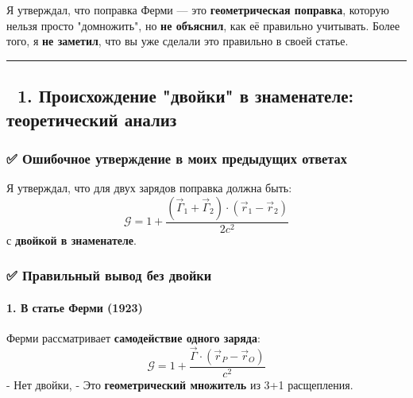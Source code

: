 \documentclass[11pt]{article}
\begin{document}
Я утверждал, что поправка Ферми --- это \textbf{геометрическая
поправка}, которую нельзя просто "домножить", но \textbf{не объяснил},
как её правильно учитывать. Более того, я \textbf{не заметил}, что вы
уже сделали это правильно в своей статье.

\begin{center}\rule{0.5\linewidth}{\linethickness}\end{center}

\subsection{🔹 1. Происхождение "двойки" в знаменателе: теоретический
анализ}\label{ux43fux440ux43eux438ux441ux445ux43eux436ux434ux435ux43dux438ux435-ux434ux432ux43eux439ux43aux438-ux432-ux437ux43dux430ux43cux435ux43dux430ux442ux435ux43bux435-ux442ux435ux43eux440ux435ux442ux438ux447ux435ux441ux43aux438ux439-ux430ux43dux430ux43bux438ux437}

\subsubsection{✅ Ошибочное утверждение в моих предыдущих
ответах}\label{ux43eux448ux438ux431ux43eux447ux43dux43eux435-ux443ux442ux432ux435ux440ux436ux434ux435ux43dux438ux435-ux432-ux43cux43eux438ux445-ux43fux440ux435ux434ux44bux434ux443ux449ux438ux445-ux43eux442ux432ux435ux442ux430ux445}

Я утверждал, что для двух зарядов поправка должна быть: \[
\mathcal{G} = 1 + \frac{(\vec{\Gamma}_1 + \vec{\Gamma}_2) \cdot (\vec{r}_1 - \vec{r}_2)}{2c^2}
\] с \textbf{двойкой в знаменателе}.

\subsubsection{✅ Правильный вывод без
двойки}\label{ux43fux440ux430ux432ux438ux43bux44cux43dux44bux439-ux432ux44bux432ux43eux434-ux431ux435ux437-ux434ux432ux43eux439ux43aux438}

\paragraph{1. В статье Ферми
(1923)}\label{ux432-ux441ux442ux430ux442ux44cux435-ux444ux435ux440ux43cux438-1923}

Ферми рассматривает \textbf{самодействие одного заряда}: \[
\mathcal{G} = 1 + \frac{\vec{\Gamma} \cdot (\vec{r}_P - \vec{r}_O)}{c^2}
\] - Нет двойки, - Это \textbf{геометрический множитель} из 3+1
расщепления.
\end{document}
